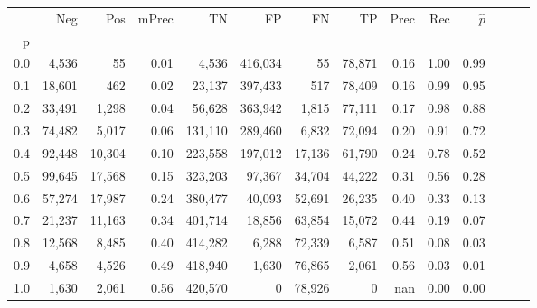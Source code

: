 \begin{tabular}{rrrrrrrrrrrrrr}
\toprule
{} &     Neg &     Pos & mPrec &       TN &       FP &      FN &      TP &  Prec &   Rec & $\hat{p}$ \\
p   &         &         &       &          &          &         &         &       &       &           \\
\midrule
0.0 &   4,536 &      55 &  0.01 &    4,536 &  416,034 &      55 &  78,871 &  0.16 &  1.00 &      0.99 \\
0.1 &  18,601 &     462 &  0.02 &   23,137 &  397,433 &     517 &  78,409 &  0.16 &  0.99 &      0.95 \\
0.2 &  33,491 &   1,298 &  0.04 &   56,628 &  363,942 &   1,815 &  77,111 &  0.17 &  0.98 &      0.88 \\
0.3 &  74,482 &   5,017 &  0.06 &  131,110 &  289,460 &   6,832 &  72,094 &  0.20 &  0.91 &      0.72 \\
0.4 &  92,448 &  10,304 &  0.10 &  223,558 &  197,012 &  17,136 &  61,790 &  0.24 &  0.78 &      0.52 \\
0.5 &  99,645 &  17,568 &  0.15 &  323,203 &   97,367 &  34,704 &  44,222 &  0.31 &  0.56 &      0.28 \\
0.6 &  57,274 &  17,987 &  0.24 &  380,477 &   40,093 &  52,691 &  26,235 &  0.40 &  0.33 &      0.13 \\
0.7 &  21,237 &  11,163 &  0.34 &  401,714 &   18,856 &  63,854 &  15,072 &  0.44 &  0.19 &      0.07 \\
0.8 &  12,568 &   8,485 &  0.40 &  414,282 &    6,288 &  72,339 &   6,587 &  0.51 &  0.08 &      0.03 \\
0.9 &   4,658 &   4,526 &  0.49 &  418,940 &    1,630 &  76,865 &   2,061 &  0.56 &  0.03 &      0.01 \\
1.0 &   1,630 &   2,061 &  0.56 &  420,570 &        0 &  78,926 &       0 &   nan &  0.00 &      0.00 \\
\bottomrule
\end{tabular}
